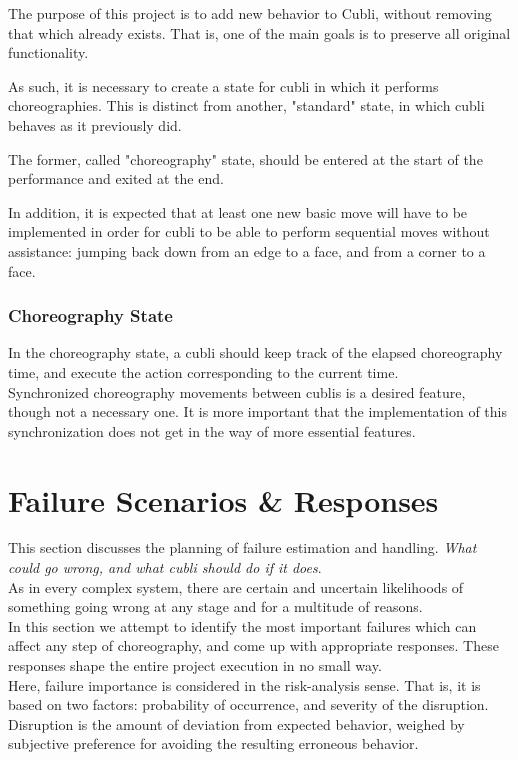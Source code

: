 The purpose of this project is to add new behavior to Cubli, without removing that which already exists. That is, one of the main goals is to preserve all original functionality.

As such, it is necessary to create a state for cubli in which it performs choreographies. This is distinct from another, "standard" state, in which cubli behaves as it previously did.

The former, called "choreography" state, should be entered at the start of the performance and exited at the end.

In addition, it is expected that at least one new basic move will have to be implemented in order for cubli to be able to perform sequential moves without assistance: jumping back down from an edge to a face, and from a corner to a face.

\subsubsection{Choreography State}

In the choreography state, a cubli should keep track of the elapsed choreography time, and execute the action corresponding to the current time.\\

Synchronized choreography movements between cublis is a desired feature, though not a necessary one. It is more important that the implementation of this synchronization does not get in the way of more essential features.\\

\section{Failure Scenarios \& Responses}
This section discusses the planning of failure estimation and handling.
\textit{What could go wrong, and what cubli should do if it does}.\\

As in every complex system, there are certain and uncertain likelihoods of something going wrong at any stage and for a multitude of reasons.\\

In this section we attempt to identify the most important failures which can affect any step of choreography, and come up with appropriate responses. These responses shape the entire project execution in no small way.\\

Here, failure importance is considered in the risk-analysis sense. That is, it is based on two factors: probability of occurrence, and severity of the disruption. Disruption is the amount of deviation from expected behavior, weighed by subjective preference for avoiding the resulting erroneous behavior. \\


